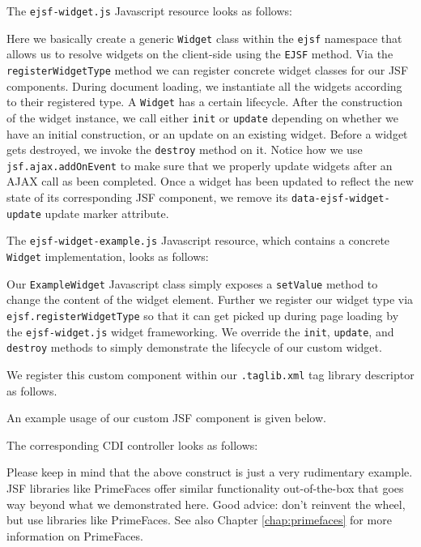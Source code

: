 The \texttt{ejsf-widget.js} Javascript resource looks as follows:

Here we basically create a generic \texttt{Widget} class within the \texttt{ejsf} namespace that allows us to resolve widgets on the client-side using the \texttt{EJSF} method.
Via the \texttt{registerWidgetType} method we can register concrete widget classes for our JSF components.
During document loading, we instantiate all the widgets according to their registered type.
A \texttt{Widget} has a certain lifecycle. After the construction of the widget instance, we call either \texttt{init} or \texttt{update} depending on whether we have an initial construction, or an update on an existing widget.
Before a widget gets destroyed, we invoke the \texttt{destroy} method on it.
Notice how we use \texttt{jsf.ajax.addOnEvent} to make sure that we properly update widgets after an AJAX call as been completed.
Once a widget has been updated to reflect the new state of its corresponding JSF component, we remove its \texttt{data-ejsf-widget-update} update marker attribute.

The \texttt{ejsf-widget-example.js} Javascript resource, which contains a concrete \texttt{Widget} implementation, looks as follows:

Our \texttt{ExampleWidget} Javascript class simply exposes a \texttt{setValue} method to change the content of the widget element.
Further we register our widget type via \texttt{ejsf.register\allowbreak Widget\allowbreak Type} so that it can get picked up during page loading by the \texttt{ejsf-widget.js} widget frameworking.
We override the \texttt{init}, \texttt{update}, and \texttt{destroy} methods to simply demonstrate the lifecycle of our custom widget.

We register this custom component within our \texttt{.taglib.xml} tag library descriptor as follows.


An example usage of our custom JSF component is given below.

The corresponding CDI controller looks as follows:

Please keep in mind that the above construct is just a very rudimentary example.
JSF libraries like PrimeFaces offer similar functionality out-of-the-box that goes way beyond what we demonstrated here.
Good advice: don't reinvent the wheel, but use libraries like PrimeFaces.
See also Chapter \ref{chap:primefaces} for more information on PrimeFaces.


